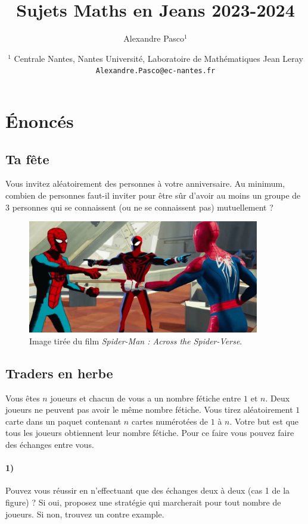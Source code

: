 \documentclass[a4paper,10pt,oneside]{article}
\title{Sujets Maths en Jeans 2023-2024}
\author{
  Alexandre Pasco${}^{1}$}
\date{\medskip%
  \small %
  ${}^1$  Centrale Nantes, Nantes Université, Laboratoire de Mathématiques Jean Leray\\
  \texttt{Alexandre.Pasco@ec-nantes.fr}
  }
\begin{document}
\maketitle

\section{Énoncés}

\subsection{Ta fête}
Vous invitez aléatoirement des personnes à votre anniversaire. 
Au minimum, combien de personnes faut-il inviter pour être sûr d'avoir au moins un groupe de $3$ personnes qui se connaissent (ou ne se connaissent pas) mutuellement ? 

\vspace{3cm}
\begin{figure}[!ht]
  \centering
  \includegraphics[width=0.9\textwidth]{figures/fete.png}
  \caption*{Image tirée du film \textit{Spider-Man : Across the Spider-Verse}.}
\end{figure}

\newpage
\subsection{Traders en herbe}

Vous êtes $n$ joueurs et chacun de vous a un nombre fétiche entre $1$ et $n$. 
Deux joueurs ne peuvent pas avoir le même nombre fétiche.
Vous tirez aléatoirement $1$ carte dans un paquet contenant $n$ cartes numérotées de $1$ à $n$. Votre but est que tous les joueurs obtiennent leur nombre fétiche.
Pour ce faire vous pouvez faire des échanges entre vous.

\paragraph*{1)} 
Pouvez vous réussir en n'effectuant que des échanges deux à deux (cas 1 de la figure) ? 
Si oui, proposez une stratégie qui marcherait pour tout nombre de joueurs.
Si non, trouvez un contre example.
\end{document}
